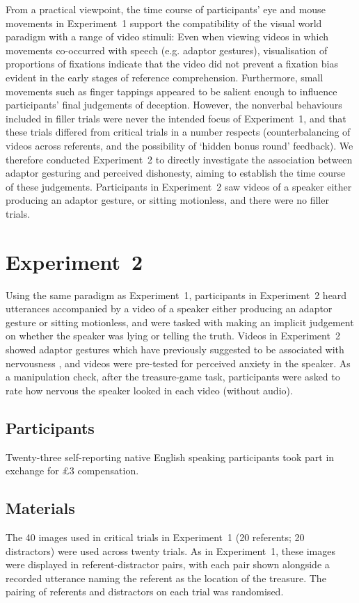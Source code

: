 \documentclass[a4paper,man,natbib]{apa6}
\begin{document}
From a practical viewpoint, the time course of participants' eye  and mouse movements in Experiment~1 support the compatibility of the visual world paradigm with a range of video stimuli: Even when viewing videos in which movements co-occurred with speech (e.g. adaptor gestures), visualisation of proportions of fixations indicate that the video did not prevent a fixation bias evident in the early stages of reference comprehension.
Furthermore, small movements such as finger tappings appeared to be salient enough to influence participants' final judgements of deception.
However, the nonverbal behaviours included in filler trials were never the intended focus of Experiment~1, and that these trials differed from critical trials in a number respects (counterbalancing of videos across referents, and the possibility of `hidden bonus round' feedback).
We therefore conducted Experiment~2 to directly investigate the association between adaptor gesturing and perceived dishonesty, aiming to establish the time course of these judgements.
Participants in Experiment~2 saw videos of a speaker either producing an adaptor gesture, or sitting motionless, and there were no filler trials.

\section{Experiment~2}
Using the same paradigm as Experiment~1, participants in Experiment~2 heard utterances accompanied by a video of a speaker either producing an adaptor gesture or sitting motionless, and were tasked with making an implicit judgement on whether the speaker was lying or telling the truth.
Videos in Experiment~2 showed adaptor gestures which have previously suggested to be associated with nervousness \citep[See][]{Gregersen2005}, and videos were pre-tested for perceived anxiety in the speaker.
As a manipulation check, after the treasure-game task, participants were asked to rate how nervous the speaker looked in each video (without audio).

\subsection{Participants}
Twenty-three self-reporting native English speaking participants took part in exchange for \pounds{}3 compensation.


\subsection{Materials}
The 40 images used in critical trials in Experiment~1 (20 referents; 20 distractors) were used across twenty trials.
As in Experiment~1, these images were displayed in referent-distractor pairs, with each pair shown alongside a recorded utterance naming the referent as the location of the treasure.
The pairing of referents and distractors on each trial was randomised.
\end{document}
